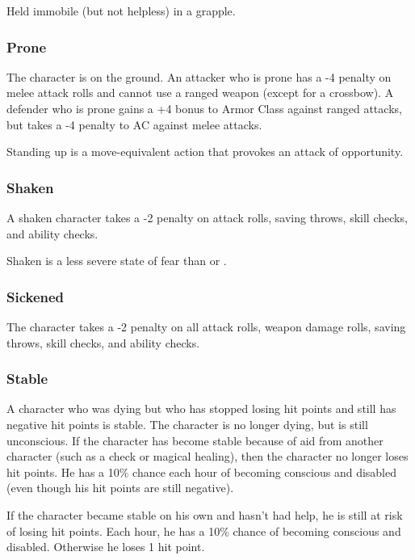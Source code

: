 Held immobile (but not helpless) in a grapple.

\subsubsection{Prone}

The character is on the ground. An attacker who is prone has a 
-4 penalty on melee attack rolls and cannot use a ranged weapon (except for a crossbow). 
A defender who is prone gains a +4 bonus to Armor Class against ranged attacks, 
but takes a -4 penalty to AC against melee attacks.

Standing up is a move-equivalent action that provokes an attack of opportunity.

\subsubsection{Shaken}

A shaken character takes a -2 penalty on attack rolls, saving 
throws, skill checks, and ability checks.

Shaken is a less severe state of fear than  or .

\subsubsection{Sickened}

The character takes a -2 penalty on all attack rolls, weapon 
damage rolls, saving throws, skill checks, and ability checks.

\subsubsection{Stable}

A character who was dying but who has stopped losing hit points 
and still has negative hit points is stable. The character is no longer dying, 
but is still unconscious. If the character has become stable because of aid from 
another character (such as a  check or magical healing), then the character 
no longer loses hit points. He has a 10\% chance each hour of becoming conscious 
and disabled (even though his hit points are still negative). 

If the character became stable on his own and hasn't had help, he is still at risk 
of losing hit points. Each hour, he has a 10\% chance of becoming conscious and 
disabled. Otherwise he loses 1 hit point.

